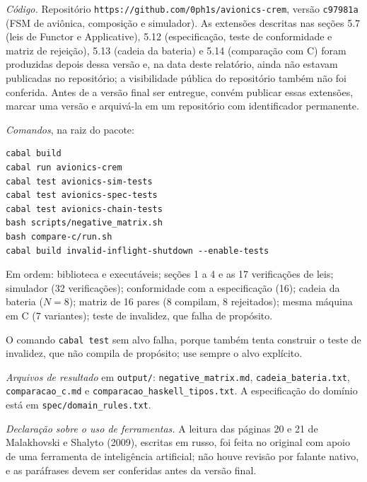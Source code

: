 \documentclass[12pt,a4paper]{article}
\begin{document}
\textit{Código.} Repositório \texttt{https://github.com/0ph1s/avionics-crem}, versão \texttt{c97981a} (FSM de aviônica, composição e simulador). As extensões descritas nas seções 5.7 (leis de Functor e Applicative), 5.12 (especificação, teste de conformidade e matriz de rejeição), 5.13 (cadeia da bateria) e 5.14 (comparação com C) foram produzidas depois dessa versão e, na data deste relatório, ainda não estavam publicadas no repositório; a visibilidade pública do repositório também não foi conferida. Antes de a versão final ser entregue, convém publicar essas extensões, marcar uma versão e arquivá-la em um repositório com identificador permanente.

\textit{Comandos}, na raiz do pacote:

{\footnotesize
\begin{verbatim}
cabal build
cabal run avionics-crem
cabal test avionics-sim-tests
cabal test avionics-spec-tests
cabal test avionics-chain-tests
bash scripts/negative_matrix.sh
bash compare-c/run.sh
cabal build invalid-inflight-shutdown --enable-tests
\end{verbatim}
}

Em ordem: biblioteca e executáveis; seções 1 a 4 e as 17 verificações de leis; simulador (32 verificações); conformidade com a especificação (16); cadeia da bateria ($N = 8$); matriz de 16 pares (8 compilam, 8 rejeitados); mesma máquina em C (7 variantes); teste de invalidez, que falha de propósito.

O comando \texttt{cabal test} sem alvo falha, porque também tenta construir o teste de invalidez, que não compila de propósito; use sempre o alvo explícito.

\textit{Arquivos de resultado} em \texttt{output/}: \texttt{negative\_matrix.md}, \texttt{cadeia\_bateria.txt}, \texttt{comparacao\_c.md} e \texttt{comparacao\_haskell\_tipos.txt}. A especificação do domínio está em \texttt{spec/domain\_rules.txt}.

\textit{Declaração sobre o uso de ferramentas.} A leitura das páginas 20 e 21 de Malakhovski e Shalyto (2009), escritas em russo, foi feita no original com apoio de uma ferramenta de inteligência artificial; não houve revisão por falante nativo, e as paráfrases devem ser conferidas antes da versão final.
\end{document}
